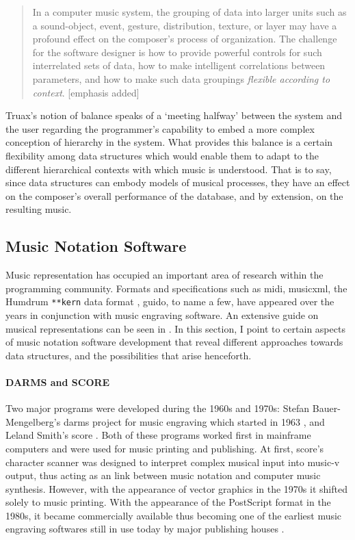 \documentclass[
]{book}
\newcommand{\im}[0]{[emphasis added] }
\begin{document}
\begin{quote}
	In a computer music system, the grouping of data into larger units such as a sound-object, event, gesture, distribution, texture, or layer may have a profound effect on the composer's process of organization. The challenge for the software designer is how to provide powerful controls for such interrelated sets of data, how to make intelligent correlations between parameters, and how to make such data groupings \textit{flexible according to context}. \im \parencite[157]{Emm86:The}
\end{quote}

Truax's notion of balance speaks of a `meeting halfway' between the system and the user regarding the programmer's capability to embed a more complex conception of hierarchy in the system. What provides this balance is a certain flexibility among data structures which would enable them to adapt to the different hierarchical contexts with which music is understood. That is to say, since data structures can embody models of musical processes, they have an effect on the composer's overall performance of the database, and by extension, on the resulting music. 

\subsection{Music Notation Software}
\label{applications:notation}

Music representation has occupied an important area of research within the programming community. Formats and specifications such as \gls{midi}, \gls{musicxml}, the Humdrum \texttt{**kern} data format \parencite{DBLP:conf/ismir/Sapp05}, \gls{guido}, to name a few, have appeared over the years in conjunction with music engraving software. An extensive guide on musical representations can be seen in \textcite{Selfridge-Field:1997:BMH:275928}. In this section, I point to certain aspects of music notation software development that reveal different approaches towards data structures, and the possibilities that arise henceforth.

\paragraph{DARMS and SCORE}
Two major programs were developed during the 1960s and 1970s: Stefan Bauer-Mengelberg's \gls{darms} project for music engraving which started in 1963 \parencites{icmc/bbp2372.1983.002}{10.2307/30204239}, and Leland Smith's  \gls{score} \parencite{smith1971}. Both of these programs worked first in mainframe computers and were used for music printing and publishing. At first, \gls{score}'s character scanner was designed to interpret complex musical input into \gls{music-v} output, thus acting as an link between music notation and computer music synthesis. However, with the appearance of vector graphics in the 1970s it shifted solely to music printing.  With the appearance of the PostScript format in the 1980s, it became commercially available thus becoming one of the earliest music engraving softwares still in use today by major publishing houses \parencite{scoremus}. 
\end{document}
